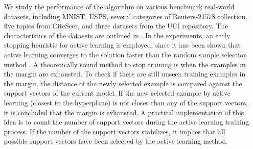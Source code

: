 We study the performance of the algorithm on various benchmark real-world datasets, including MNIST, USPS, several categories of Reuters-21578 collection, five topics from CiteSeer, and three datasets from the UCI repository. The characteristics of the datasets are outlined in \cite{Ertekin2_2007}. In the experiments, an early stopping heuristic for active learning is employed, since it has been shown that active learning converges to the solution faster than the random sample selection method \cite{Ertekin2_2007}. A theoretically sound method to stop training is when the examples in the margin are exhausted. To check if there are still unseen training examples in the margin, the distance of the newly selected example is compared against the support vectors of the current model. If the new selected example by active learning (closest to the hyperplane) is not closer than any of the support vectors, it is concluded that the margin is exhausted. A practical implementation of this idea is to count the number of support vectors during the active learning training process. If the number of the support vectors stabilizes, it implies that all possible support vectors have been selected by the active learning method.

